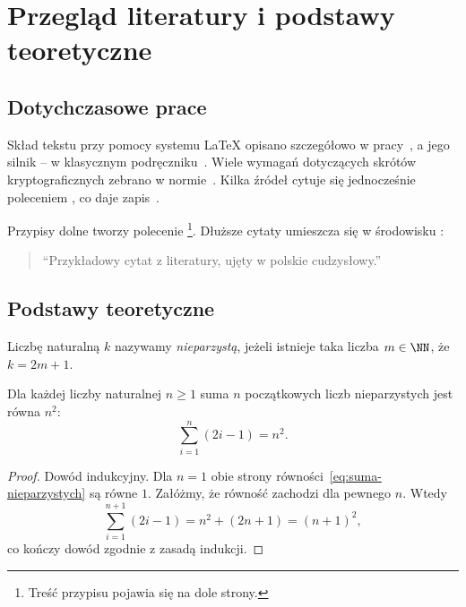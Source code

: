 \chapter{Przegląd literatury i podstawy teoretyczne}\label{ch:przeglad}


\section{Dotychczasowe prace}\label{sec:prace}

Skład tekstu przy pomocy systemu \LaTeX{} opisano szczegółowo w pracy~\cite{lamport1994}, a jego silnik
-- w klasycznym podręczniku~\cite{knuth1984}. Wiele wymagań dotyczących skrótów kryptograficznych
zebrano w normie~\cite{fips180-4}. Kilka źródeł cytuje się jednocześnie poleceniem
, co daje zapis~\cite{lamport1994,knuth1984}.

Przypisy dolne tworzy polecenie \footnote{Treść przypisu pojawia się na dole strony.}.
Dłuższe cytaty umieszcza się w środowisku :
\begin{quote}
    \enquote{Przykładowy cytat z literatury, ujęty w polskie cudzysłowy.}~\cite{knuth1984}
\end{quote}

\section{Podstawy teoretyczne}\label{sec:podstawy}

\begin{definition}\label{def:nieparzyste}
    Liczbę naturalną $k$ nazywamy \emph{nieparzystą}, jeżeli istnieje taka liczba $m \in \NN$, że $k = 2m + 1$.
\end{definition}

\begin{theorem}\label{thm:suma-nieparzystych}
    Dla każdej liczby naturalnej $n \geq 1$ suma $n$ początkowych liczb nieparzystych jest równa $n^2$:
    \begin{equation}\label{eq:suma-nieparzystych}
        \sum_{i=1}^{n} (2i - 1) = n^2 .
    \end{equation}
\end{theorem}

\begin{proof}
    Dowód indukcyjny. Dla $n = 1$ obie strony równości~\eqref{eq:suma-nieparzystych} są równe $1$. Załóżmy,
    że równość zachodzi dla pewnego $n$. Wtedy
    \[
        \sum_{i=1}^{n+1} (2i - 1) = n^2 + (2n + 1) = (n + 1)^2 ,
    \]
    co kończy dowód zgodnie z zasadą indukcji.
\end{proof}

